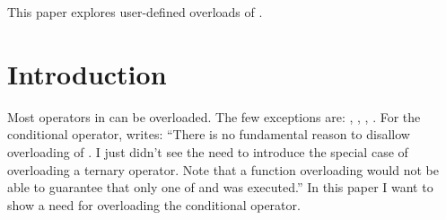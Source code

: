 \newcommand\wgTitle{Making operator?: overloadable}
\newcommand\wgName{Matthias Kretz <m.kretz@gsi.de>}
\newcommand\wgDocumentNumber{P0917R3}
\newcommand\wgGroup{EWG-I}
\newcommand\wgTarget{\CC{}23}

\usepackage{mymacros}
\usepackage{wg21}
\usepackage{changelog}
\usepackage{underscore}



\newcommand\simd[1][]{\type{simd#1}\xspace}
\newcommand\simdT{\type{simd<T>}\xspace}
\newcommand\valuetype{\type{value\_type}\xspace}
\newcommand\referencetype{\type{reference}\xspace}
\newcommand\whereexpression{\type{where\_expression}\xspace}
\newcommand\simdcast{\code{simd\_cast}\xspace}
\newcommand\mask[1][]{\type{simd\_mask#1}\xspace}
\newcommand\maskT{\type{simd\_mask<T>}\xspace}
\newcommand\fixedsizeN{\type{simd\_abi::fixed\_size<N>}\xspace}
\newcommand\fixedsizescoped{\type{simd\_abi::fixed\_size}\xspace}
\newcommand\fixedsize{\type{fixed\_size}\xspace}
\newcommand\simdEP{\code{execution::}\type{simd}\xspace}
\newcommand\seqEP{\code{execution::}\type{seq}\xspace}

\newenvironment{tonytable}[1]{
\renewcommand\tablename{Tony Table}
\begin{table}[h]
\caption{#1}
\begin{tabular}{p{.45\textwidth}|p{.45\textwidth}}
before&after\\
\hline
}{
\end{tabular}
\end{table}
\renewcommand\tablename{Table}
}


\begin{wgTitlepage}
  This paper explores user-defined overloads of .
\end{wgTitlepage}

\pagestyle{scrheadings}
\section{Introduction}
Most operators in \CC{} can be overloaded.
The few exceptions are: , \code{::}, , .
For the conditional operator, \textcite{StrFaq} writes:
“There is no fundamental reason to disallow overloading of .
I just didn't see the need to introduce the special case of overloading a ternary operator.
Note that a function overloading  would not be able to guarantee that only one of  and  was executed.”
In this paper I want to show a need for overloading the conditional operator.

